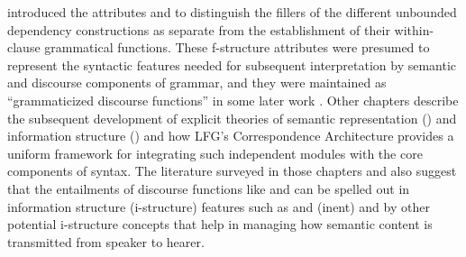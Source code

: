 \documentclass[output=paper,hidelinks]{langscibook}
\begin{document}


 \citet{kaplanbresnan82} introduced the attributes \TOPIC and \FOCUS to distinguish the fillers of the different unbounded dependency constructions as separate from the establishment of their within-clause grammatical functions.  These f-structure attributes were presumed to represent the syntactic features needed for subsequent interpretation by semantic and discourse components of grammar, and they were maintained as ``grammaticized discourse functions'' in some later work \citep[e.g.][]{BM87}.  Other chapters describe the subsequent development of explicit theories of semantic representation () and information structure  () and how LFG's Correspondence Architecture \citep{kaplan1987three,kaplan1995formal} provides a uniform framework for integrating such independent modules with the core components of syntax.  The literature surveyed in those chapters and also \citet{DLM:LFG} suggest that the entailments of discourse functions like \TOPIC and \FOCUS can be spelled out in information structure (i-structure) features such as   and (inent) and by other potential i-structure concepts that help in managing how semantic content is transmitted from speaker to hearer.   
 
\end{document}
